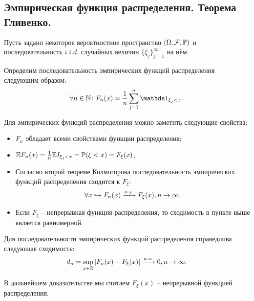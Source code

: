 \subsection{Эмпирическая функция распределения. Теорема Гливенко.}
Пусть задано некоторое вероятностное пространство $(\Omega, \mathcal{F}, \P)$ и последовательность $i.i.d.$ случайных величин $\{\xi_j\}_{j = 1}^\infty$ на нём.
\begin{definition}
    Определим последовательность эмпирических функций распределения следующим образом:
    \[
        \forall n \in \N\colon F_n(x) = \dfrac{1}{n}\sum\limits_{j = 1}^n \Ind_{\xi_j < x}.
    \]
\end{definition}
\begin{note}
    Для эмпирических функций распределения можно заметить следующие свойства:
    \begin{itemize}
        \item $F_n$ обладает всеми свойствами функции распределения;
        \item $\Ex F_n(x) = \frac{1}{n}\Ex I_{\xi_j < x} = \P(\xi < x) = F_\xi(x)$;
        \item Согласно второй теореме Колмогорова последовательность эмпирических функций распределения сходится к $F_\xi$:
        \[
            \forall x \hookrightarrow F_n(x) \xrightarrow{a.s.} F_\xi(x), n \ra \infty.
        \]
        \item Если $F_\xi$ -- непрерывная функция распределения, то сходимость в пункте выше является равномерной.
    \end{itemize}
\end{note}
\begin{theorem}
    Для последовательности эмпирических функций распределения справедлива следующая сходимость:
    \[
        d_n = \sup\limits_{x \in \R} |F_n(x) - F_\xi(x)| \xrightarrow{a.s.} 0, n \ra \infty.
    \]
\end{theorem}
\begin{note}
    В дальнейшем доказательстве мы считаем $F_\xi(x)$ -- непрерывной функцией распределения.
\end{note}
